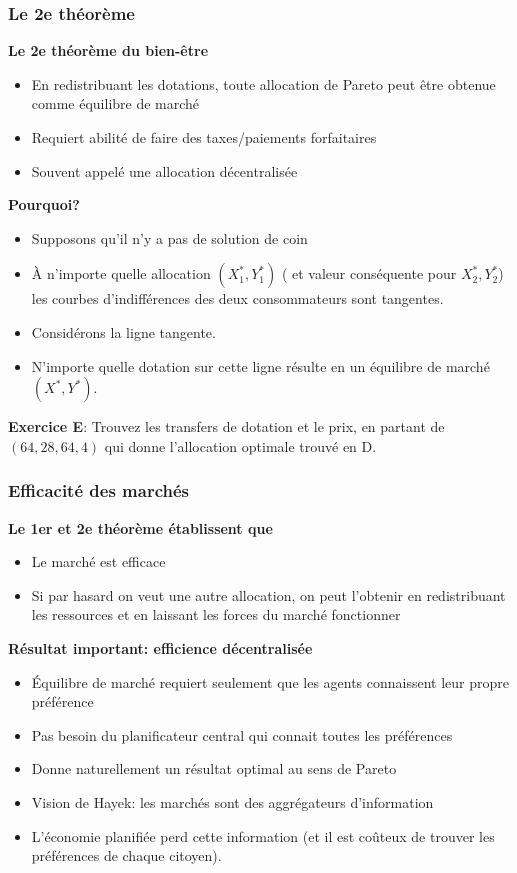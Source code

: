 \documentclass[handout]{beamer}
\newenvironment{iPar}[1]{\textbf{#1} \begin{itemize}}{\end{itemize}}
\newcommand{\mdp}{\medskip \pause}
\begin{document}
\begin{frame}\frametitle{Le 2e théorème}

\begin{iPar}{Le 2e théorème du bien-être} \item En redistribuant les dotations, toute allocation de Pareto peut être obtenue comme équilibre de marché \item Requiert abilité de faire des taxes/paiements forfaitaires \item Souvent appelé une allocation décentralisée
\end{iPar}\mdp

\begin{iPar}{Pourquoi?}\item Supposons qu'il n'y a pas de solution de coin \item À n'importe quelle allocation $(X_1^*,Y_1^*)$ ( et valeur conséquente pour
$X_2^*,Y_2^*$) les courbes d'indifférences des deux consommateurs sont tangentes.
\item Considérons la ligne tangente. \item N'importe quelle dotation sur cette ligne résulte en un équilibre de marché $(X^*,Y^*)$. \end{iPar}

\textbf{Exercice E}: Trouvez les transfers de dotation et le prix, en partant de $(64,28,64,4)$ qui donne l'allocation optimale trouvé en D.  

\end{frame}


\begin{frame}\frametitle{Efficacité des marchés}
\begin{iPar}{Le 1er et 2e théorème établissent que} \item
Le marché est efficace \item Si par hasard on veut une autre allocation, on peut l'obtenir en redistribuant les ressources et en laissant les forces du marché fonctionner  \end{iPar}\mdp

\begin{iPar}{Résultat important: efficience décentralisée} \item Équilibre de marché requiert seulement que les agents connaissent leur propre préférence   \item Pas besoin du planificateur central qui connait toutes les préférences \item Donne naturellement un résultat optimal au sens de Pareto \item
Vision de Hayek: les marchés sont des aggrégateurs d'information \item L'économie planifiée perd cette information (et il est coûteux de trouver les préférences de chaque citoyen). 
\end{iPar}

\end{frame}
\end{document}
